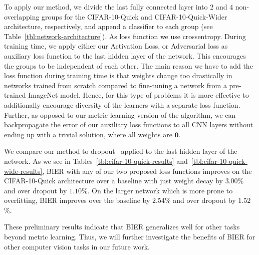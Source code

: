 \documentclass[10pt,journal,compsoc]{IEEEtran}
\begin{document}
To apply our method,
we divide the last fully
connected layer into $2$ and $4$ non-overlapping groups for the CIFAR-10-Quick and CIFAR-10-Quick-Wider architecture, respectively,
and append a classifier to each group (see Table~\ref{tbl:network-architecture}). As loss function we use crossentropy.
During training time, we apply either our Activation Loss, or Adversarial loss as auxiliary loss function to the last hidden layer of the network.
This encourages the groups to be independent of each other.  
The main reason we have to add the loss function during training time is that
weights change too drastically in networks trained from scratch compared
to fine-tuning a network from a pre-trained ImageNet model. 
Hence, for this type of problems it is more effective to 
additionally encourage diversity of the learners
with a separate loss function.
Further, as opposed to our metric learning version of the algorithm, we can backpropagate the error 
of our auxiliary loss functions to all \ac{CNN} layers without ending up with a trivial solution, where all weights are $\boldsymbol{0}$.

We compare our method to dropout~\cite{srivastava14dropout} applied to the last hidden layer of the network.
As we see in Tables~\ref{tbl:cifar-10-quick-results} and~\ref{tbl:cifar-10-quick-wide-results}, \ac{BIER} with any of our two proposed loss functions improves on the CIFAR-10-Quick architecture over a baseline
with just weight decay by $3.00$\% and over dropout by $1.10$\%. On the larger network which is more prone to overfitting, \ac{BIER} improves over the baseline
by $2.54$\% and over dropout by $1.52$\%.

These preliminary results indicate that \ac{BIER} generalizes well for other
tasks beyond metric learning. Thus, we will further investigate the benefits of
\ac{BIER} for other computer vision tasks in our future work.
\end{document}
